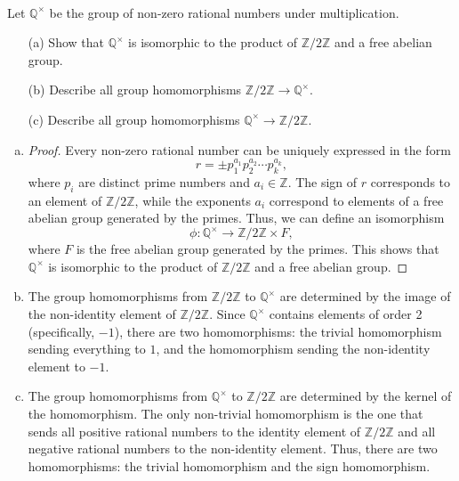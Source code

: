 \documentclass{article}
\def\zz{{\mathbb Z}}
\def\qq{{\mathbb Q}}
\begin{document}
\begin{problem} \\
    Let $\qq^\times$ be the group of non-zero rational numbers under multiplication.
    \begin{enumerate}
        \item[(a)] Show that $\qq^\times$ is isomorphic to the product of $\zz/2\zz$ and a free abelian group. %
        \item[(b)] Describe all group homomorphisms $\zz/2\zz \to \qq^\times$. %
        \item[(c)] Describe all group homomorphisms $\qq^\times \to \zz/2\zz$. %
    \end{enumerate}

\end{problem}


\begin{enumerate}[(a)]
    \item \begin{proof}
        Every non-zero rational number can be uniquely expressed in the form 
        \[
            r = \pm p_1^{a_1} p_2^{a_2} \cdots p_k^{a_k},
        \]
        where $p_i$ are distinct prime numbers and $a_i \in \zz$. The sign of $r$ corresponds to an element of $\zz/2\zz$, while the exponents $a_i$ correspond to elements of a free abelian group generated by the primes. Thus, we can define an isomorphism
        \[
            \phi : \qq^\times \to \zz/2\zz \times F,
        \]
        where $F$ is the free abelian group generated by the primes. This shows that $\qq^\times$ is isomorphic to the product of $\zz/2\zz$ and a free abelian group.
    \end{proof}
    \item The group homomorphisms from $\zz/2\zz$ to $\qq^\times$ are determined by the image of the non-identity element of $\zz/2\zz$. Since $\qq^\times$ contains elements of order 2 (specifically, $-1$), there are two homomorphisms: the trivial homomorphism sending everything to $1$, and the homomorphism sending the non-identity element to $-1$.
    \item The group homomorphisms from $\qq^\times$ to $\zz/2\zz$ are determined by the kernel of the homomorphism. The only non-trivial homomorphism is the one that sends all positive rational numbers to the identity element of $\zz/2\zz$ and all negative rational numbers to the non-identity element. Thus, there are two homomorphisms: the trivial homomorphism and the sign homomorphism.
\end{enumerate}
\end{document}

